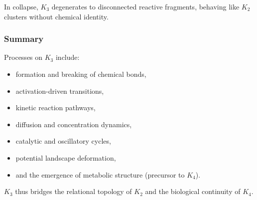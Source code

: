 In collapse, $K_3$ degenerates to disconnected reactive fragments,
behaving like $K_2$ clusters without chemical identity.

\subsubsection{Summary}

Processes on $K_3$ include:
\begin{itemize}
    \item formation and breaking of chemical bonds,
    \item activation-driven transitions,
    \item kinetic reaction pathways,
    \item diffusion and concentration dynamics,
    \item catalytic and oscillatory cycles,
    \item potential landscape deformation,
    \item and the emergence of metabolic structure (precursor to $K_4$).
\end{itemize}

$K_3$ thus bridges the relational topology of $K_2$ and the biological
continuity of $K_4$.
